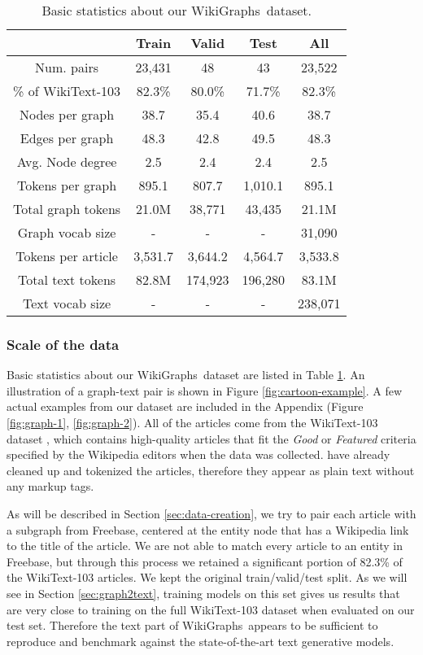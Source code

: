 \documentclass[11pt]{article}
\newcommand{\ourdataset}{{WikiGraphs}}
\newcommand{\secref}[1]{Section \ref{#1}}
\newcommand{\tabref}[1]{Table \ref{#1}}
\newcommand{\figref}[1]{Figure \ref{#1}}
\begin{document}
\begin{table}[t]
\centering
\setlength{\tabcolsep}{3.5pt}
{\small
\begin{tabular}{c|c|c|c|c}
\hline
    & Train & Valid & Test & All\\
    \hline
    Num. pairs & 23,431 & 48 & 43 & 23,522\\
    \% of WikiText-103 & 82.3\% & 80.0\% & 71.7\% & 82.3\%\\
    Nodes per graph & 38.7 & 35.4 & 40.6 & 38.7 \\
    Edges per graph & 48.3 & 42.8 & 49.5 & 48.3 \\
    Avg. Node degree & 2.5 & 2.4 & 2.4 & 2.5 \\
    Tokens per graph & 895.1 & 807.7 & 1,010.1 & 895.1 \\
    Total graph tokens & 21.0M & 38,771 & 43,435 & 21.1M \\
    Graph vocab size & - & - & - & 31,090 \\
    Tokens per article & 3,531.7 & 3,644.2 & 4,564.7 & 3,533.8 \\
    Total text tokens & 82.8M & 174,923 & 196,280 & 83.1M \\
    Text vocab size & - & - & - & 238,071 \\
    \hline
\end{tabular}
}
\caption{Basic statistics about our \ourdataset~dataset. }
\label{tab:basic-stats}
\end{table}



\subsubsection{Scale of the data}

Basic statistics about our \ourdataset~dataset are listed in \tabref{tab:basic-stats}.  An illustration of a graph-text pair is shown in \figref{fig:cartoon-example}.  A few actual examples from our dataset are included in the Appendix (\figref{fig:graph-1}, \ref{fig:graph-2}).  All of the articles come from the WikiText-103 dataset \cite{merity2016pointer}, which contains high-quality articles that fit the \emph{Good} or \emph{Featured} criteria specified by the Wikipedia editors when the data was collected.  \citet{merity2016pointer} have already cleaned up and tokenized the articles, therefore they appear as plain text without any markup tags.

As will be described in \secref{sec:data-creation}, we try to pair each article with a subgraph from Freebase, centered at the entity node that has a Wikipedia link to the title of the article.  We are not able to match every article to an entity in Freebase, but through this process we retained a significant portion of 82.3\% of the WikiText-103 articles.  We kept the original train/valid/test split.  As we will see in \secref{sec:graph2text}, training models on this set gives us results that are very close to training on the full WikiText-103 dataset when evaluated on our test set.
Therefore the text part of \ourdataset~appears to be sufficient to reproduce and benchmark against the state-of-the-art text generative models. 
\end{document}

